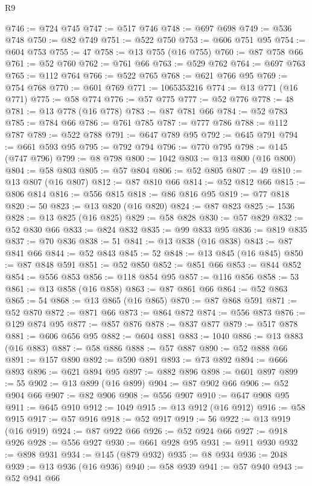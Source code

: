 \begin{lexlean}{R9}
\begin{coremodule}
@746 := @724 @745
@747 := @517 @746
@748 := @697 @698
@749 := @536 @748
@750 := @82 @749
@751 := @522 @750
@753 := @606 @751 @95
@754 := @604 @753
@755 := 47
@758 := @13 @755 (@16 @755)
@760 := @87 @758 @66
@761 := @52 @760
@762 := @761 @66
@763 := @529 @762
@764 := @697 @763
@765 := @112 @764
@766 := @522 @765
@768 := @621 @766 @95
@769 := @754 @768
@770 := @601 @769
@771 := 1065353216
@774 := @13 @771 (@16 @771)
@775 := @58 @774
@776 := @57 @775
@777 := @52 @776
@778 := 48
@781 := @13 @778 (@16 @778)
@783 := @87 @781 @66
@784 := @52 @783
@785 := @784 @66
@786 := @761 @785
@787 := @777 @786
@788 := @112 @787
@789 := @522 @788
@791 := @647 @789 @95
@792 := @645 @791
@794 := @661 @593 @95
@795 := @792 @794
@796 := @770 @795
@798 := @145 (@747 @796)
@799 := @8 @798
@800 := 1042
@803 := @13 @800 (@16 @800)
@804 := @58 @803
@805 := @57 @804
@806 := @52 @805
@807 := 49
@810 := @13 @807 (@16 @807)
@812 := @87 @810 @66
@814 := @52 @812 @66
@815 := @806 @814
@816 := @556 @815
@818 := @86 @816 @95
@819 := @77 @818
@820 := 50
@823 := @13 @820 (@16 @820)
@824 := @87 @823
@825 := 1536
@828 := @13 @825 (@16 @825)
@829 := @58 @828
@830 := @57 @829
@832 := @52 @830 @66
@833 := @824 @832
@835 := @99 @833 @95
@836 := @819 @835
@837 := @70 @836
@838 := 51
@841 := @13 @838 (@16 @838)
@843 := @87 @841 @66
@844 := @52 @843
@845 := 52
@848 := @13 @845 (@16 @845)
@850 := @87 @848 @591
@851 := @52 @850
@852 := @851 @66
@853 := @844 @852
@854 := @556 @853
@856 := @118 @854 @95
@857 := @116 @856
@858 := 53
@861 := @13 @858 (@16 @858)
@863 := @87 @861 @66
@864 := @52 @863
@865 := 54
@868 := @13 @865 (@16 @865)
@870 := @87 @868 @591
@871 := @52 @870
@872 := @871 @66
@873 := @864 @872
@874 := @556 @873
@876 := @129 @874 @95
@877 := @857 @876
@878 := @837 @877
@879 := @517 @878
@881 := @606 @656 @95
@882 := @604 @881
@883 := 1040
@886 := @13 @883 (@16 @883)
@887 := @58 @886
@888 := @57 @887
@890 := @52 @888 @66
@891 := @157 @890
@892 := @590 @891
@893 := @73 @892
@894 := @666 @893
@896 := @621 @894 @95
@897 := @882 @896
@898 := @601 @897
@899 := 55
@902 := @13 @899 (@16 @899)
@904 := @87 @902 @66
@906 := @52 @904 @66
@907 := @82 @906
@908 := @556 @907
@910 := @647 @908 @95
@911 := @645 @910
@912 := 1049
@915 := @13 @912 (@16 @912)
@916 := @58 @915
@917 := @57 @916
@918 := @52 @917
@919 := 56
@922 := @13 @919 (@16 @919)
@924 := @87 @922 @66
@926 := @52 @924 @66
@927 := @918 @926
@928 := @556 @927
@930 := @661 @928 @95
@931 := @911 @930
@932 := @898 @931
@934 := @145 (@879 @932)
@935 := @8 @934
@936 := 2048
@939 := @13 @936 (@16 @936)
@940 := @58 @939
@941 := @57 @940
@943 := @52 @941 @66

\end{coremodule}
\end{lexlean}

